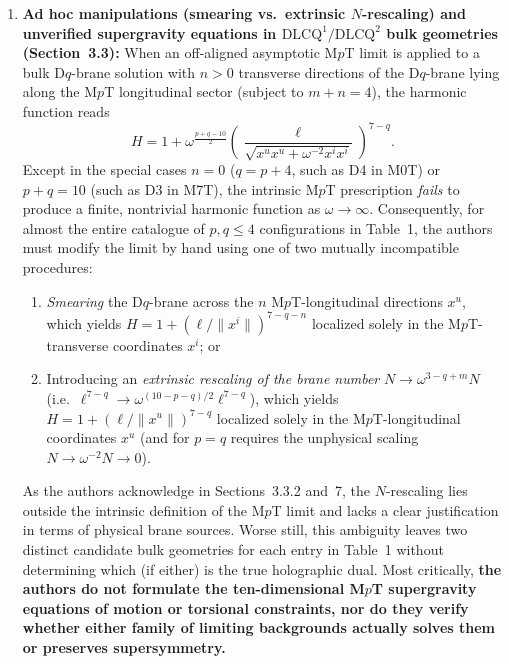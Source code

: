 \documentclass[11pt,a4paper]{article}
\begin{document}
\begin{enumerate}[label=(\alph*), leftmargin=1.8em]
    \item \textbf{Ad hoc manipulations (smearing vs.\ extrinsic $N$-rescaling) and unverified supergravity equations in $\text{DLCQ}^1/\text{DLCQ}^2$ bulk geometries (Section~3.3):}
    When an off-aligned asymptotic M$p$T limit is applied to a bulk D$q$-brane solution with $n > 0$ transverse directions of the D$q$-brane lying along the M$p$T longitudinal sector (subject to $m+n=4$), the harmonic function reads
    \begin{equation}
        H = 1 + \omega^{\frac{p+q-10}{2}} \left(\frac{\ell}{\sqrt{x^u x^u + \omega^{-2} x^i x^i}}\right)^{\!7-q}.
        \label{eq:H_mixed}
    \end{equation}
    Except in the special cases $n=0$ ($q=p+4$, such as D4 in M0T) or $p+q=10$ (such as D3 in M7T), the intrinsic M$p$T prescription \emph{fails} to produce a finite, nontrivial harmonic function as $\omega \to \infty$. Consequently, for almost the entire catalogue of $p,q \le 4$ configurations in Table~1, the authors must modify the limit by hand using one of two mutually incompatible procedures:
    \begin{enumerate}[label=(\roman*), nosep]
        \item \emph{Smearing} the D$q$-brane across the $n$ M$p$T-longitudinal directions $x^u$, which yields $H = 1 + (\boldsymbol{\ell}/\|x^i\|)^{7-q-n}$ localized solely in the M$p$T-transverse coordinates $x^i$; or
        \item Introducing an \emph{extrinsic rescaling of the brane number} $N \to \omega^{3-q+m} N$ (i.e.\ $\ell^{7-q} \to \omega^{(10-p-q)/2}\ell^{7-q}$), which yields $H = 1 + (\ell/\|x^u\|)^{7-q}$ localized solely in the M$p$T-longitudinal coordinates $x^u$ (and for $p=q$ requires the unphysical scaling $N \to \omega^{-2}N \to 0$).
    \end{enumerate}
    As the authors acknowledge in Sections~3.3.2 and~7, the $N$-rescaling lies outside the intrinsic definition of the M$p$T limit and lacks a clear justification in terms of physical brane sources. Worse still, this ambiguity leaves two distinct candidate bulk geometries for each entry in Table~1 without determining which (if either) is the true holographic dual. Most critically, \textbf{the authors do not formulate the ten-dimensional M$p$T supergravity equations of motion or torsional constraints, nor do they verify whether either family of limiting backgrounds actually solves them or preserves supersymmetry.}


\end{enumerate}
\end{document}
